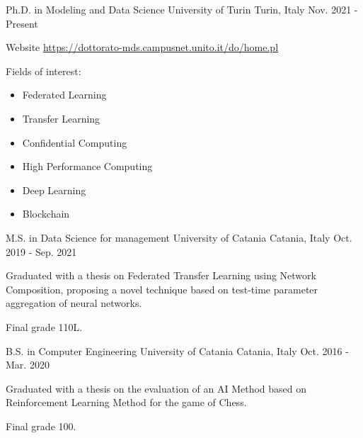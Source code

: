 

\begin{cventries}


  \cventry
    {Ph.D. in Modeling and Data Science} %
    {University of Turin} %
    {Turin, Italy} %
    {Nov. 2021 - Present} %
    {
      \begin{cvitems} %
        \item {Website \href{https://dottorato-mds.campusnet.unito.it/do/home.pl}{https://dottorato-mds.campusnet.unito.it/do/home.pl}}
        \item {Fields of interest: \begin{itemize}
        \item Federated Learning
        \item Transfer Learning
        \item Confidential Computing
        \item High Performance Computing
        \item Deep Learning
        \item Blockchain
        \end{itemize}}
      \end{cvitems}
    }


  \cventry
    {M.S. in Data Science for management} %
    {University of Catania} %
    {Catania, Italy} %
    {Oct. 2019 - Sep. 2021} %
    {
      \begin{cvitems} %
        \item {Graduated with a thesis on Federated Transfer Learning using Network Composition, proposing a novel technique based on test-time parameter aggregation of neural networks.}
        \item {Final grade 110L.}
      \end{cvitems}
    }

  \cventry
    {B.S. in Computer Engineering} %
    {University of Catania} %
    {Catania, Italy} %
    {Oct. 2016 - Mar. 2020} %
    {
      \begin{cvitems} %
        \item {Graduated with a thesis on the evaluation of an AI Method based on Reinforcement Learning Method for the game of Chess.}
        \item {Final grade 100.}
      \end{cvitems}
    }


\end{cventries}
